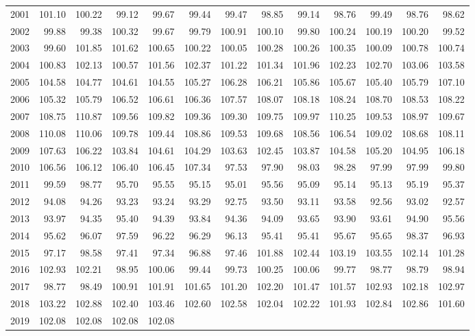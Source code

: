 \begin{longtable}{rrrrrrrrrrrrr}
  2001 & 101.10 & 100.22 & 99.12 & 99.67 & 99.44 & 99.47 & 98.85 & 99.14 & 98.76 & 99.49 & 98.76 & 98.62 \\ 
  2002 & 99.88 & 99.38 & 100.32 & 99.67 & 99.79 & 100.91 & 100.10 & 99.80 & 100.24 & 100.19 & 100.20 & 99.52 \\ 
  2003 & 99.60 & 101.85 & 101.62 & 100.65 & 100.22 & 100.05 & 100.28 & 100.26 & 100.35 & 100.09 & 100.78 & 100.74 \\ 
  2004 & 100.83 & 102.13 & 100.57 & 101.56 & 102.37 & 101.22 & 101.34 & 101.96 & 102.23 & 102.70 & 103.06 & 103.58 \\ 
  2005 & 104.58 & 104.77 & 104.61 & 104.55 & 105.27 & 106.28 & 106.21 & 105.86 & 105.67 & 105.40 & 105.79 & 107.10 \\ 
  2006 & 105.32 & 105.79 & 106.52 & 106.61 & 106.36 & 107.57 & 108.07 & 108.18 & 108.24 & 108.70 & 108.53 & 108.22 \\ 
  2007 & 108.75 & 110.87 & 109.56 & 109.82 & 109.36 & 109.30 & 109.75 & 109.97 & 110.25 & 109.53 & 108.97 & 109.67 \\ 
  2008 & 110.08 & 110.06 & 109.78 & 109.44 & 108.86 & 109.53 & 109.68 & 108.56 & 106.54 & 109.02 & 108.68 & 108.11 \\ 
  2009 & 107.63 & 106.22 & 103.84 & 104.61 & 104.29 & 103.63 & 102.45 & 103.87 & 104.58 & 105.20 & 104.95 & 106.18 \\ 
  2010 & 106.56 & 106.12 & 106.40 & 106.45 & 107.34 & 97.53 & 97.90 & 98.03 & 98.28 & 97.99 & 97.99 & 99.80 \\ 
  2011 & 99.59 & 98.77 & 95.70 & 95.55 & 95.15 & 95.01 & 95.56 & 95.09 & 95.14 & 95.13 & 95.19 & 95.37 \\ 
  2012 & 94.08 & 94.26 & 93.23 & 93.24 & 93.29 & 92.75 & 93.50 & 93.11 & 93.58 & 92.56 & 93.02 & 92.57 \\ 
  2013 & 93.97 & 94.35 & 95.40 & 94.39 & 93.84 & 94.36 & 94.09 & 93.65 & 93.90 & 93.61 & 94.90 & 95.56 \\ 
  2014 & 95.62 & 96.07 & 97.59 & 96.22 & 96.29 & 96.13 & 95.41 & 95.41 & 95.67 & 95.65 & 98.37 & 96.93 \\ 
  2015 & 97.17 & 98.58 & 97.41 & 97.34 & 96.88 & 97.46 & 101.88 & 102.44 & 103.19 & 103.55 & 102.14 & 101.28 \\ 
  2016 & 102.93 & 102.21 & 98.95 & 100.06 & 99.44 & 99.73 & 100.25 & 100.06 & 99.77 & 98.77 & 98.79 & 98.94 \\ 
  2017 & 98.77 & 98.49 & 100.91 & 101.91 & 101.65 & 101.20 & 102.20 & 101.47 & 101.57 & 102.93 & 102.18 & 102.97 \\ 
  2018 & 103.22 & 102.88 & 102.40 & 103.46 & 102.60 & 102.58 & 102.04 & 102.22 & 101.93 & 102.84 & 102.86 & 101.60 \\ 
  2019 & 102.08 & 102.08 & 102.08 & 102.08 &  &  &  &  &  &  &  &  \\ 
   \hline
\hline
\end{longtable}
